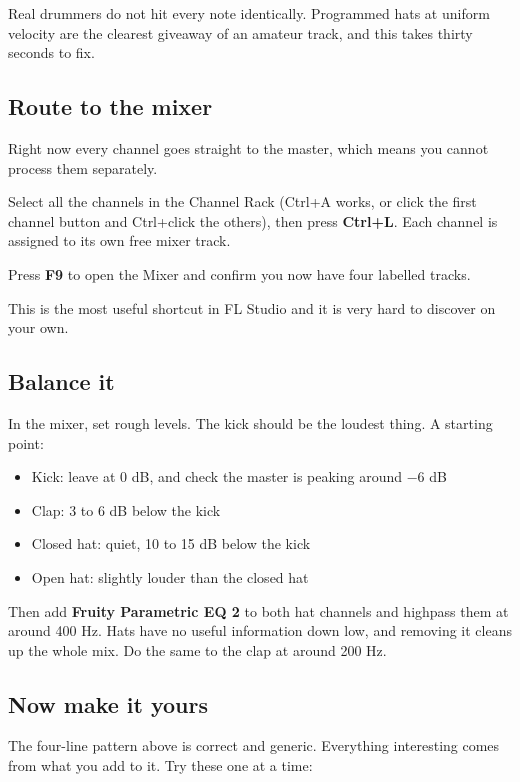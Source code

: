 Real drummers do not hit every note identically. Programmed hats at uniform velocity are the
clearest giveaway of an amateur track, and this takes thirty seconds to fix.

\subsection{Route to the mixer}\label{fl02_first_beat-route-to-the-mixer}

Right now every channel goes straight to the master, which means you cannot process them
separately.

Select all the channels in the Channel Rack (Ctrl+A works, or click the first channel button
and Ctrl+click the others), then press \textbf{Ctrl+L}. Each channel is assigned to its own free
mixer track.

Press \textbf{F9} to open the Mixer and confirm you now have four labelled tracks.

This is the most useful shortcut in FL Studio and it is very hard to discover on your own.

\subsection{Balance it}\label{fl02_first_beat-balance-it}

In the mixer, set rough levels. The kick should be the loudest thing. A starting point:

\begin{itemize}
\tightlist
\item
  Kick: leave at 0 dB, and check the master is peaking around −6 dB
\item
  Clap: 3 to 6 dB below the kick
\item
  Closed hat: quiet, 10 to 15 dB below the kick
\item
  Open hat: slightly louder than the closed hat
\end{itemize}

Then add \textbf{Fruity Parametric EQ 2} to both hat channels and highpass them at around 400 Hz.
Hats have no useful information down low, and removing it cleans up the whole mix. Do the
same to the clap at around 200 Hz.

\subsection{Now make it yours}\label{fl02_first_beat-now-make-it-yours}

The four-line pattern above is correct and generic. Everything interesting comes from what
you add to it. Try these one at a time:

